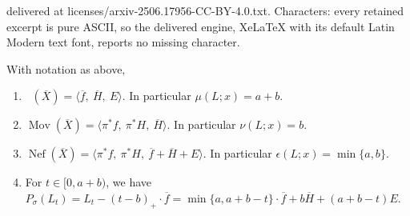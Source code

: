\documentclass[10pt,a4paper]{amsart}
\DeclareMathOperator{\Eff}{\overline{Eff}}
\DeclareMathOperator{\Mov}{Mov}
\DeclareMathOperator{\Nef}{Nef}
\begin{document}
delivered at licenses/arxiv-2506.17956-CC-BY-4.0.txt. Characters: every retained excerpt is pure ASCII, so the delivered engine, XeLaTeX with its default Latin Modern text font, reports no missing character.
\begin{proposition}\label{prop:blCxP2positive}
	With notation as above,
	\begin{enumerate}[(1)]
		\item $\Eff(\overline X)=\langle\overline f,\ \overline H,\ E\rangle$. In particular $\mu(L;x)=a+b$.
		\smallskip
		
		\item $\Mov(\overline X)=\langle \pi^*f,\ \pi^*H,\ \overline H\rangle$.  In particular $\nu(L;x)=b$.
		\smallskip
		
		\item $\Nef(\overline X)=\langle \pi^*f,\ \pi^*H,\ \overline f+\overline H+E\rangle$. In particular $\epsilon(L;x)=\min\{a,b\}$. 
		\smallskip
		
		\item For $t\in[0,a+b)$, we have $P_{\sigma}(L_t)=L_t-(t-b)_+\cdot\overline f=\min\{a,a+b-t\}\cdot\overline f+b\overline H+(a+b-t)E$.
	\end{enumerate}
\end{proposition}
\end{document}
